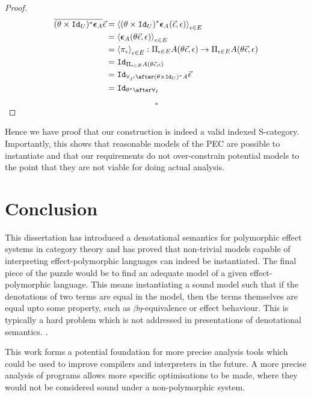 \documentclass{Report}
\begin{document}
\begin{proof}
\begin{align}
    \bar{(\theta\times\Id{U})\star \counit{A}} \ev  & = \finpr{(\theta\times\Id{U})\star\counit{A}(\ev, \e)}{\e\in E}\\
    & = \finpr{\counit{A}(\theta\ev, \e)}{e\in E}\\
    & = \finpr{\pi_\e}{\e\in E}: \Pi_{\e\in E}A(\theta\ev, \e) \rightarrow \Pi_{\e\in E}A(\theta\ev, \e)\\
    & = \Id{\Pi_{\e\in E}A(\theta\ev, \e)}\\
    & = \Id{\allII\after(\theta\times\Id{U})\star A}\ev\\
    & = \Id{\theta\star\after\allI}
\end{align}

$$\square$$
\end{proof}

Hence we have proof that our construction is indeed a valid indexed S-category. Importantly, this shows that reasonable models of the PEC are possible to instantiate and that our requirements do not over-constrain potential models to the point that they are not viable for doing actual analysis.

\chapter{Conclusion}

This dissertation has introduced a denotational semantics for polymorphic effect systems in category theory and has proved that non-trivial models capable of interpreting effect-polymorphic languages can indeed be instantiated. The final piece of the puzzle would be to find an adequate model of a given effect-polymorphic language. This means instantiating a sound model such that if the denotations of two terms are equal in the model, then the terms themselves are equal upto some property, such as $\beta\eta$-equivalence or effect behaviour. This is typically a hard problem which is not addressed in presentations of denotational semantics. .

This work forms a potential foundation for more precise analysis tools which could be used to improve compilers and interpreters in the future. A more precise analysis of programs allows more specific optimisations to be made, where they would not be considered sound under a non-polymorphic system.
\end{document}
